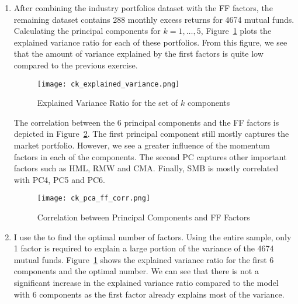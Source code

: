 \begin{solution}
    \begin{enumerate}[label = \Alph*)]
        \item After combining the industry portfolios dataset with the FF factors, the remaining dataset contains 288 monthly excess returns for 4674 mutual funds. Calculating the principal components for \(k = 1, \dots, 5\), Figure~\ref{fig:ck_explained_var} plots the explained variance ratio for each of these portfolios. From this figure, we see that the amount of variance explained by the first factors is quite low compared to the previous exercise. 
        \begin{figure}[!htbp]
            \begin{small}
                \begin{center}
                    \texttt{[image: ck\_explained\_variance.png]}
                \end{center}
                \caption{Explained Variance Ratio for the set of \(k\) components}
                \label{fig:ck_explained_var}
            \end{small}
        \end{figure}
        The correlation between the 6 principal components and the FF factors is depicted in Figure~\ref{fig:ck_pca_ff}. The first principal component still mostly captures the market portfolio. However, we see a greater influence of the momentum factors in each of the components. 
        The second PC captures other important factors such as HML, RMW and CMA. Finally, SMB is mostly correlated with PC4, PC5 and PC6.
        \begin{figure}[!htbp]
            \begin{small}
                \begin{center}
                    \texttt{[image: ck\_pca\_ff\_corr.png]}
                \end{center}
                \caption{Correlation between Principal Components and FF Factors}
                \label{fig:ck_pca_ff}
            \end{small}
        \end{figure}
        
    \item I use the \citet{connor1993test} to find the optimal number of factors. Using the entire sample, only 1 factor is required to explain a large portion of the variance of the 4674 mutual funds. Figure~\ref{fig:ck_explained_var} shows the explained variance ratio for the first 6 components and the optimal number. We can see that there is not a significant increase in the explained variance ratio compared to the model with 6 components as the first factor already explains most of the variance.
    

\end{enumerate}
\end{solution}
